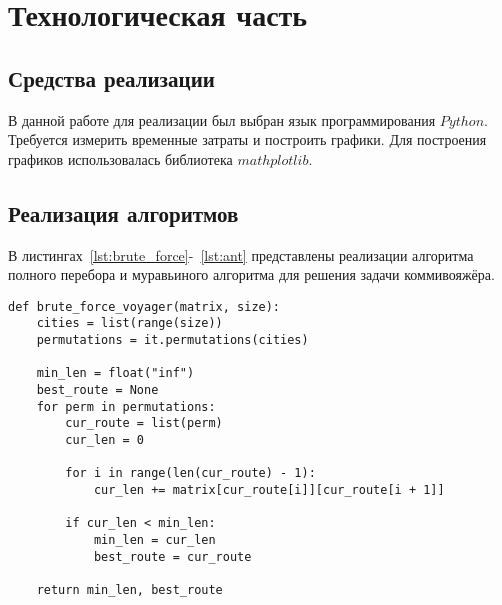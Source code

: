 \chapter{Технологическая часть}

\section{Средства реализации}

В данной работе для реализации был выбран язык программирования $Python$. Требуется измерить временные затраты и построить графики. Для построения графиков использовалась библиотека $mathplotlib$.

\section{Реализация алгоритмов}

В листингах~\ref{lst:brute_force}-~\ref{lst:ant} представлены реализации алгоритма полного перебора и муравьиного алгоритма для решения задачи коммивояжёра.
\begin{center}
    \captionsetup{justification=raggedright,singlelinecheck=off}
    \begin{lstlisting}[label=lst:brute_force,caption=Алгоритм полного перебора]
def brute_force_voyager(matrix, size):
	cities = list(range(size))
	permutations = it.permutations(cities)

	min_len = float("inf")
	best_route = None
	for perm in permutations:
		cur_route = list(perm)
		cur_len = 0

		for i in range(len(cur_route) - 1):
			cur_len += matrix[cur_route[i]][cur_route[i + 1]]

		if cur_len < min_len:
			min_len = cur_len
			best_route = cur_route

	return min_len, best_route
\end{lstlisting}
\end{center}

\clearpage

